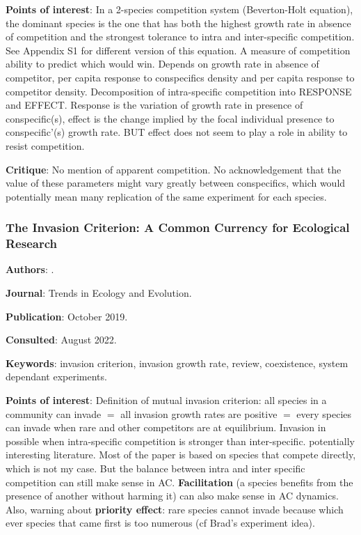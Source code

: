 \documentclass[12pt,a4paper]{article}
\begin{document}
\textbf{Points of interest}: In a 2-species competition system (Beverton-Holt equation), the dominant species is the one that has both the highest growth rate in absence of competition and the strongest tolerance to intra and inter-specific competition. See Appendix S1 for different version of this equation. A measure of competition ability to predict which would win. Depends on growth rate in absence of competitor, per capita response to conspecifics density and per capita response to competitor density. Decomposition of intra-specific competition into RESPONSE and EFFECT. Response is the variation of growth rate in presence of conspecific(s), effect is the change implied by the focal individual presence to conspecific'(s) growth rate. BUT effect does not seem to play a role in ability to resist competition.

\textbf{Critique}: No mention of apparent competition. No acknowledgement that the value of these parameters might vary greatly between conspecifics, which would potentially mean many replication of the same experiment for each species.

\newpage

\subsubsection*{The Invasion Criterion: A Common Currency for Ecological Research}

\textbf{Authors}: \cite{grainger2019invasion}.

\textbf{Journal}: Trends in Ecology and Evolution.

\textbf{Publication}: October 2019.

\textbf{Consulted}: August 2022.

\textbf{Keywords}: invasion criterion, invasion growth rate, review, coexistence, system dependant experiments.

\textbf{Points of interest}: Definition of mutual invasion criterion: all species in a community can invade $=$ all invasion growth rates are positive $=$ every species can invade when rare and other competitors are at equilibrium. Invasion in possible when intra-specific competition is stronger than inter-specific. potentially interesting literature. Most of the paper is based on species that compete directly, which is not my case. But the balance between intra and inter specific competition can still make sense in AC. \textbf{Facilitation} (a species benefits from the presence of another without harming it) can also make sense in AC dynamics. Also, warning about \textbf{priority effect}: rare species cannot invade because which ever species that came first is too numerous (cf Brad's experiment idea).
\end{document}
